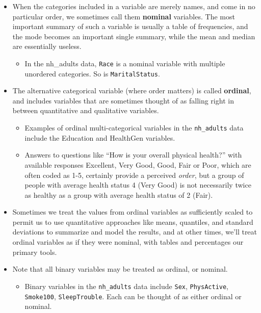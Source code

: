 \documentclass[
]{book}
\providecommand{\tightlist}{%
  \setlength{\itemsep}{0pt}\setlength{\parskip}{0pt}}
\begin{document}
\begin{itemize}
\item
  When the categories included in a variable are merely names, and come in no particular order, we sometimes call them \textbf{nominal} variables. The most important summary of such a variable is usually a table of frequencies, and the mode becomes an important single summary, while the mean and median are essentially useless.

  \begin{itemize}
  \tightlist
  \item
    In the nh\_adults data, \texttt{Race} is a nominal variable with multiple unordered categories. So is \texttt{MaritalStatus}.
  \end{itemize}
\item
  The alternative categorical variable (where order matters) is called \textbf{ordinal}, and includes variables that are sometimes thought of as falling right in between quantitative and qualitative variables.

  \begin{itemize}
  \tightlist
  \item
    Examples of ordinal multi-categorical variables in the \texttt{nh\_adults} data include the Education and HealthGen variables.
  \item
    Answers to questions like ``How is your overall physical health?'' with available responses Excellent, Very Good, Good, Fair or Poor, which are often coded as 1-5, certainly provide a perceived \emph{order}, but a group of people with average health status 4 (Very Good) is not necessarily twice as healthy as a group with average health status of 2 (Fair).
  \end{itemize}
\item
  Sometimes we treat the values from ordinal variables as sufficiently scaled to permit us to use quantitative approaches like means, quantiles, and standard deviations to summarize and model the results, and at other times, we'll treat ordinal variables as if they were nominal, with tables and percentages our primary tools.
\item
  Note that all binary variables may be treated as ordinal, or nominal.

  \begin{itemize}
  \tightlist
  \item
    Binary variables in the \texttt{nh\_adults} data include \texttt{Sex}, \texttt{PhysActive}, \texttt{Smoke100}, \texttt{SleepTrouble}. Each can be thought of as either ordinal or nominal.
  \end{itemize}
\end{itemize}
\end{document}
